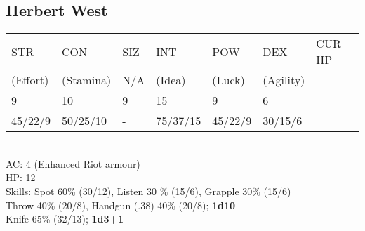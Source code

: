 \documentclass[12pt,a4paper]{article}
\begin{document}
\subsection*{Herbert West}
\begin{tabular}{| l | l | l | l | l | l |l|}
\hline
STR      & CON       & SIZ & INT    & POW    & DEX       & CUR HP\\
(Effort) & (Stamina) & N/A & (Idea) & (Luck) & (Agility) & \\
\hline
9       & 10       & 9   & 15       & 9       & 6 &\\
45/22/9 & 50/25/10 & -   & 75/37/15 & 45/22/9 & 30/15/6 &\\
\hline
\end{tabular}
\vspace{0.2cm}
\\
AC: 4 (Enhanced Riot armour)\\
HP: 12\\
Skills: Spot 60\% (30/12), Listen 30 \% (15/6), Grapple 30\% (15/6)\\
Throw 40\% (20/8), Handgun (.38) 40\% (20/8); \textbf{1d10}\\
Knife 65\% (32/13); \textbf{1d3+1}
\end{document}
